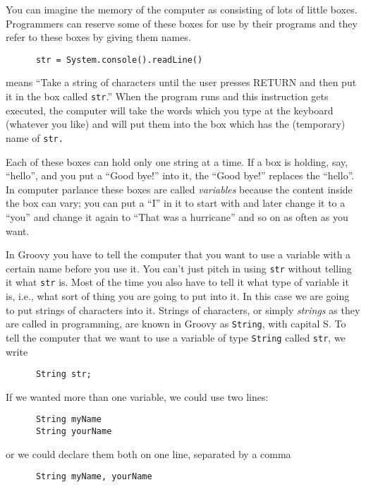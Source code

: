 You can imagine the memory of the computer as consisting of lots of
little boxes.  Programmers can reserve some of these boxes for
use by their programs and they refer to these boxes by giving
them names.  

\begin{Verbatim}
      str = System.console().readLine()
\end{Verbatim}

means ``Take a string of characters until the user presses RETURN and
then put it in the box called \verb!str!.''  When the program runs and
this instruction gets executed, the computer will take the words which
you type at the keyboard (whatever you like) and will put them into
the box which has the (temporary) name of \verb!str.!

Each of these boxes can hold only one string at a time.  If a box is
holding, say, ``hello'', and you put a ``Good bye!'' into it, the
``Good bye!'' replaces the ``hello''.  In computer parlance these
boxes are called \emph{variables} because the content inside the box
can vary; you can put a ``I'' in it to start with and later change it
to a ``you'' and change it again to ``That was a hurricane'' and so on
as often as you want.

In Groovy you have to tell the computer that you want to use a variable
with a certain name before you use it.  You can't just pitch in using \verb!str!
without telling it what \verb!str! is.  Most of the time you also have to
tell it what type of variable it is, i.e., what sort of thing you are going
to put into it.  In this case we are going to put strings of characters into it.
Strings of characters, or simply \emph{strings} as they are called in programming, are
known in Groovy as \verb!String!, with capital S.  To tell the computer that we want to use a
variable of type \verb!String! called \verb!str!, we write

\begin{Verbatim}
      String str;
\end{Verbatim}

If we wanted more than one variable, we could use two lines:

\begin{Verbatim}
      String myName
      String yourName
\end{Verbatim}

or we could declare them both on one line, separated by a comma
\begin{Verbatim}
      String myName, yourName
\end{Verbatim}

